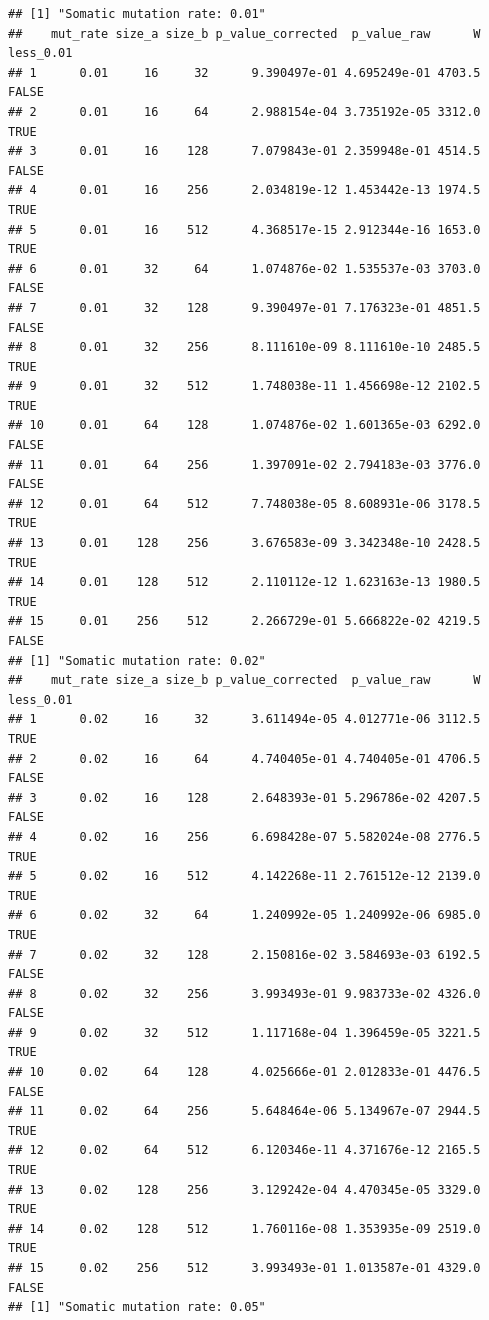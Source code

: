 \documentclass[
]{book}
\begin{document}
\begin{verbatim}
## [1] "Somatic mutation rate: 0.01"
##    mut_rate size_a size_b p_value_corrected  p_value_raw      W less_0.01
## 1      0.01     16     32      9.390497e-01 4.695249e-01 4703.5     FALSE
## 2      0.01     16     64      2.988154e-04 3.735192e-05 3312.0      TRUE
## 3      0.01     16    128      7.079843e-01 2.359948e-01 4514.5     FALSE
## 4      0.01     16    256      2.034819e-12 1.453442e-13 1974.5      TRUE
## 5      0.01     16    512      4.368517e-15 2.912344e-16 1653.0      TRUE
## 6      0.01     32     64      1.074876e-02 1.535537e-03 3703.0     FALSE
## 7      0.01     32    128      9.390497e-01 7.176323e-01 4851.5     FALSE
## 8      0.01     32    256      8.111610e-09 8.111610e-10 2485.5      TRUE
## 9      0.01     32    512      1.748038e-11 1.456698e-12 2102.5      TRUE
## 10     0.01     64    128      1.074876e-02 1.601365e-03 6292.0     FALSE
## 11     0.01     64    256      1.397091e-02 2.794183e-03 3776.0     FALSE
## 12     0.01     64    512      7.748038e-05 8.608931e-06 3178.5      TRUE
## 13     0.01    128    256      3.676583e-09 3.342348e-10 2428.5      TRUE
## 14     0.01    128    512      2.110112e-12 1.623163e-13 1980.5      TRUE
## 15     0.01    256    512      2.266729e-01 5.666822e-02 4219.5     FALSE
## [1] "Somatic mutation rate: 0.02"
##    mut_rate size_a size_b p_value_corrected  p_value_raw      W less_0.01
## 1      0.02     16     32      3.611494e-05 4.012771e-06 3112.5      TRUE
## 2      0.02     16     64      4.740405e-01 4.740405e-01 4706.5     FALSE
## 3      0.02     16    128      2.648393e-01 5.296786e-02 4207.5     FALSE
## 4      0.02     16    256      6.698428e-07 5.582024e-08 2776.5      TRUE
## 5      0.02     16    512      4.142268e-11 2.761512e-12 2139.0      TRUE
## 6      0.02     32     64      1.240992e-05 1.240992e-06 6985.0      TRUE
## 7      0.02     32    128      2.150816e-02 3.584693e-03 6192.5     FALSE
## 8      0.02     32    256      3.993493e-01 9.983733e-02 4326.0     FALSE
## 9      0.02     32    512      1.117168e-04 1.396459e-05 3221.5      TRUE
## 10     0.02     64    128      4.025666e-01 2.012833e-01 4476.5     FALSE
## 11     0.02     64    256      5.648464e-06 5.134967e-07 2944.5      TRUE
## 12     0.02     64    512      6.120346e-11 4.371676e-12 2165.5      TRUE
## 13     0.02    128    256      3.129242e-04 4.470345e-05 3329.0      TRUE
## 14     0.02    128    512      1.760116e-08 1.353935e-09 2519.0      TRUE
## 15     0.02    256    512      3.993493e-01 1.013587e-01 4329.0     FALSE
## [1] "Somatic mutation rate: 0.05"

\end{verbatim}
\end{document}
